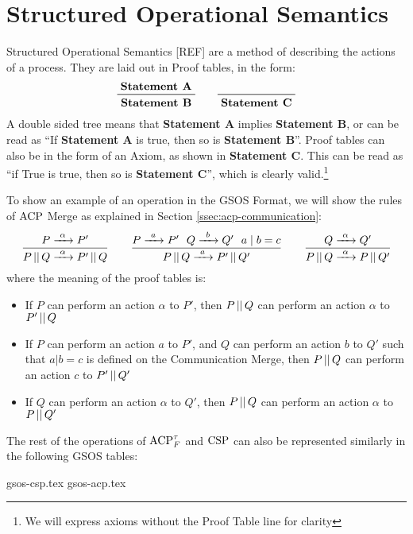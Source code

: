 \documentclass[../hons_project.tex]{subfiles}
\begin{document}
\section{Structured Operational Semantics}
Structured Operational Semantics [REF] are a method of describing the actions of a process. They are laid out in Proof tables, in the form:
\[\prftree{\text{\textbf{Statement A}}}{\text{\textbf{Statement B}}} \qquad \prftree{}{\text{\textbf{Statement C}}}\]
A double sided tree means that \textbf{Statement A} implies \textbf{Statement B}, or can be read as ``If \textbf{Statement A} is true, then so is \textbf{Statement B}''. Proof tables can also be in the form of an Axiom, as shown in \textbf{Statement C}. This can be read as ``if True is true, then so is \textbf{Statement C}'', which is clearly valid.\footnote{We will express axioms without the Proof Table line for clarity}

To show an example of an operation in the GSOS Format, we will show the rules of $\acp$ Merge as explained in Section \ref{ssec:acp-communication}:
\[
\displaystyle\frac{P\prightarrow{\alpha} P'}{P \merge Q \prightarrow{\alpha} P' \merge Q} \qquad 
\displaystyle\frac{P\prightarrow{a} P'~~Q\prightarrow{b} Q'~~ a \mid b = c}{P \merge Q \prightarrow{a} P' \merge Q'} \qquad 
\displaystyle\frac{Q\prightarrow{\alpha} Q'}{P \merge Q \prightarrow{\alpha} P \merge Q'}
\]
where the meaning of the proof tables is:
\begin{itemize}
    \item If $P$ can perform an action $\alpha$ to $P'$, then $P \merge Q$ can perform an action $\alpha$ to $P' \merge Q$
    \item If $P$ can perform an action $a$ to $P'$, and $Q$ can perform an action $b$ to $Q'$ such that $a | b = c$ is defined on the Communication Merge, then $P \merge Q$ can perform an action $c$ to $P' \merge Q'$
    \item If $Q$ can perform an action $\alpha$ to $Q'$, then $P \merge Q$ can perform an action $\alpha$ to $P \merge Q'$
\end{itemize}

The rest of the operations of $\acptf$ and $\csp$ can also be represented similarly in the following GSOS tables:

{gsos-csp.tex}
{gsos-acp.tex}
\end{document}
